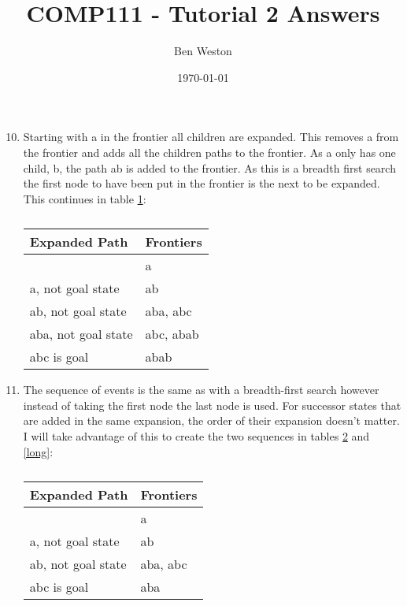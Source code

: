 \documentclass{article}
\title{COMP111 - Tutorial 2 Answers}
\author{Ben Weston}
\date{\today}
\begin{document}
\maketitle
\begin{enumerate}\setcounter{enumi}{9}
	\item{Starting with a in the frontier all children are expanded. This removes a from the frontier and adds all the children paths to the frontier. As a only has one child, b, the path ab is added to the frontier. As this is a breadth first search the first node to have been put in the frontier is the next to be expanded. This continues in table \ref{q10}:

\begin{table}[H]
\centering
	\begin{tabular}{|l|l|}
	\hline
	Expanded Path & Frontiers\\
	\hline\hline
	& a\\
	\hline
	a, not goal state & ab\\
	\hline
	ab, not goal state & aba, abc\\
	\hline
	aba, not goal state & abc, abab\\
	\hline
	abc is goal & abab\\
	\hline
\end{tabular}
\caption{}
\label{q10}
\end{table}}

\item{The sequence of events is the same as with a breadth-first search however instead of taking the first node the last node is used. For successor states that are added in the same expansion, the order of their expansion doesn't matter. I will take advantage of this to create the two sequences in tables \ref{short} and \ref{long}:

\begin{table}[H]
\centering
\begin{tabular}{|l|l|}
	\hline
	Expanded Path & Frontiers\\
	\hline\hline
	& a\\
	\hline
	a, not goal state & ab\\
	\hline
	ab, not goal state & aba, abc\\
	\hline
	abc is goal & aba\\
	\hline
\end{tabular}
\caption{}\label{short}
\end{table}

}
\end{enumerate}
\end{document}
